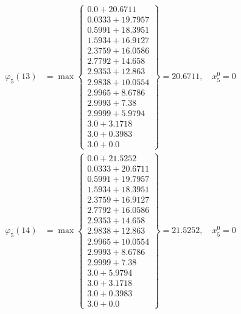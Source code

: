 \documentclass{article}
\begin{document}
\begin{align*}
  
  
  
\varphi_{5}(13) &= \max \left\{ \begin{array}{c}
0.0 + 20.6711 \\
 0.0333 + 19.7957 \\
 0.5991 + 18.3951 \\
 1.5934 + 16.9127 \\
 2.3759 + 16.0586 \\
 2.7792 + 14.658 \\
 2.9353 + 12.863 \\
 2.9838 + 10.0554 \\
 2.9965 + 8.6786 \\
 2.9993 + 7.38 \\
 2.9999 + 5.9794 \\
 3.0 + 3.1718 \\
 3.0 + 0.3983 \\
 3.0 + 0.0
\end{array} \right\}=20.6711,\quad x_{5}^0=0\\
  
  
  
  
\varphi_{5}(14) &= \max \left\{ \begin{array}{c}
0.0 + 21.5252 \\
 0.0333 + 20.6711 \\
 0.5991 + 19.7957 \\
 1.5934 + 18.3951 \\
 2.3759 + 16.9127 \\
 2.7792 + 16.0586 \\
 2.9353 + 14.658 \\
 2.9838 + 12.863 \\
 2.9965 + 10.0554 \\
 2.9993 + 8.6786 \\
 2.9999 + 7.38 \\
 3.0 + 5.9794 \\
 3.0 + 3.1718 \\
 3.0 + 0.3983 \\
 3.0 + 0.0
\end{array} \right\}=21.5252,\quad x_{5}^0=0\\
  
  
  

\end{align*}
\end{document}
